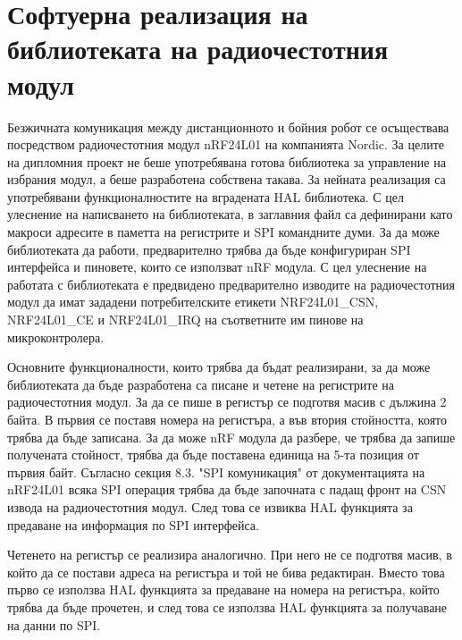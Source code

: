\section{Софтуерна реализация на библиотеката на радиочестотния модул}
\label{sec:library}

Безжичната комуникация между дистанционното и бойния робот се осъществава посредством радиочестотния модул nRF24L01 на компанията Nordic. За целите на дипломния проект не беше употребявана готова библиотека за управление на избрания модул, а беше разработена собствена такава. За нейната реализация са употребявани функционалностите на вградената HAL библиотека. С цел улеснение на написването на библиотеката, в заглавния файл са дефинирани като макроси адресите в паметта на регистрите и SPI командните думи. За да може библиотеката да работи, предварително трябва да бъде конфигуриран SPI интерфейса и пиновете, които се използват nRF модула. С цел улеснение на работата с библиотеката е предвидено предварително изводите на радиочестотния модул да имат зададени потребителските етикети NRF24L01\_CSN, NRF24L01\_CE и NRF24L01\_IRQ на съответните им пинове на микроконтролера.

Основните функционалности, които трябва да бъдат реализирани, за да може библиотеката да бъде разработена са писане и четене на регистрите на радиочестотния модул. За да се пише в регистър се подготвя масив с дължина 2 байта. В първия се поставя номера на регистъра, а във втория стойността, която трябва да бъде записана. За да може nRF модула да разбере, че трябва да запише получената стойност, трябва да бъде поставена единица на 5-та позиция от първия байт. Съгласно секция 8.3. "SPI комуникация" от документацията на nRF24L01 всяка SPI операция трябва да бъде започната с падащ фронт на CSN извода на радиочестотния модул. След това се извиква HAL функцията за предаване на информация по SPI интерфейса.



Четенето на регистър се реализира аналогично. При него не се подготвя масив, в който да се постави адреса на регистъра и той не бива редактиран. Вместо това първо се използва HAL функцията за предаване на номера на регистъра, който трябва да бъде прочетен, и след това се използва HAL функцията за получаване на данни по SPI.



